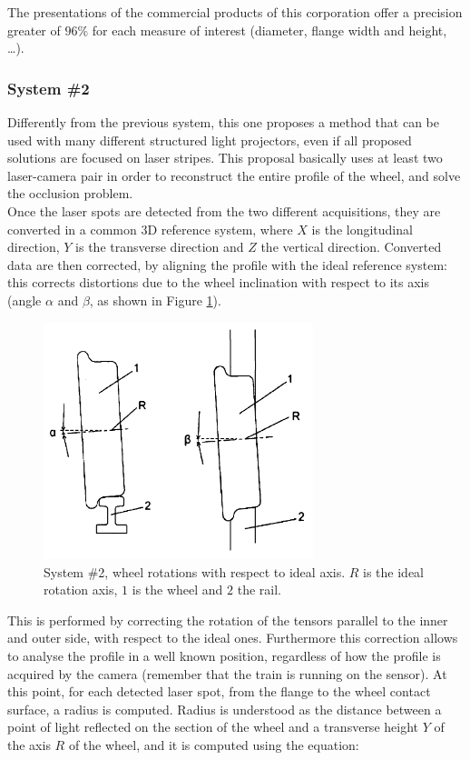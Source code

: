 The presentations of the commercial products of this corporation offer a precision greater of $96\%$ for each measure of interest (diameter, flange width and height, \ldots).



\subsubsection{System \#2} %
Differently from the previous system, this one proposes a method that can be used with many different structured light projectors, even if all proposed solutions are focused on laser stripes. This proposal basically uses at least two laser-camera pair in order to reconstruct the entire profile of the wheel, and solve the occlusion problem. \\
Once the laser spots are detected from the two different acquisitions, they are converted in a common 3D reference system, where $X$ is the longitudinal direction, $Y$ is the transverse direction and $Z$ the vertical direction. Converted data are then corrected, by aligning the profile with the ideal reference system: this corrects distortions due to the wheel inclination with respect to its axis (angle $\alpha$ and $\beta$, as shown in Figure \ref{fig:cmp-sys2}).
  \begin{figure}[t!]
    \centering
    \includegraphics[width=0.7\textwidth]{./images/wpms/wheel-rotation.png}
    \caption{System \#2, wheel rotations with respect to ideal axis. $R$ is the ideal rotation axis, $1$ is the wheel and $2$ the rail.}
    \label{fig:cmp-sys2}
  \end{figure}
This is performed by correcting the rotation of the tensors parallel to the inner and outer side, with respect to the ideal ones. Furthermore this correction allows to analyse the profile in a well known position, regardless of how the profile is acquired by the camera (remember that the train is running on the sensor). At this point, for each detected laser spot, from the flange to the wheel contact surface, a radius is computed. Radius is understood as the distance between a point of light reflected on the section of the wheel and a transverse height $Y$ of the axis $R$ of the wheel, and it is computed using the equation:
